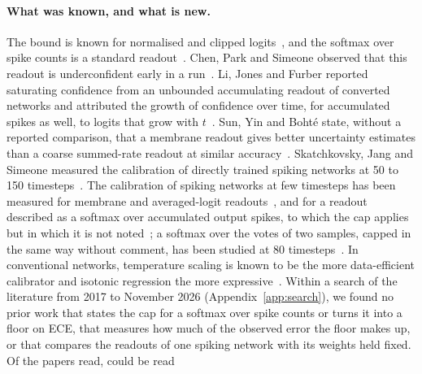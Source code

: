\documentclass[10pt]{article}
\begin{document}
\paragraph{What was known, and what is new.}
The bound is known for normalised and clipped logits~\citep{wang2017normface,zhang2019adacos,wei2022logitnorm,wei2023logitclip}, %
and the softmax over spike counts is a standard readout~\citep{wu2019spikecount,shrestha2022spikemax}. %
Chen, Park and Simeone observed that this readout is underconfident early in a
run~\citep{chen2025knowing}. Li, Jones and Furber reported saturating confidence from an unbounded %
accumulating readout of converted networks and attributed the growth of confidence over time, for
accumulated spikes as well, to logits that grow with $t$~\citep{li2023dynamic}. Sun, Yin and %
Boht\'e state, without a reported comparison, that a membrane readout gives better uncertainty
estimates than a coarse summed-rate readout at similar accuracy~\citep{sun2023mcdropout}. %
Skatchkovsky, Jang and Simeone
measured the calibration of directly trained spiking networks at 50 to 150
timesteps~\citep{skatchkovsky2022bayesian}. The calibration of spiking networks at few timesteps %
has been measured for membrane and averaged-logit readouts~\citep{sun2023mcdropout,yan2025temporal}, %
and for a readout described as a softmax over accumulated output spikes, to which the cap
applies but in which it is not noted~\citep{katti2024bayesian}; a softmax over the votes of two samples, capped in the same way %
without comment, has been studied at 80 timesteps~\citep{jang2022multisample}. %
In conventional networks, temperature scaling is known to be the more data-efficient calibrator
and isotonic regression the more expressive~\citep{zhang2020mixnmatch}. Within a search of the %
literature from 2017 to November 2026 (Appendix~\ref{app:search}), we found no prior work that
states the cap for a softmax over spike counts or turns it into a floor on ECE, that measures how
much of the observed error the floor makes up, or that compares the readouts of one spiking
network with its weights held fixed. Of the \lsRead{} papers read, \lsReadAbstract{} could be read %
\end{document}
